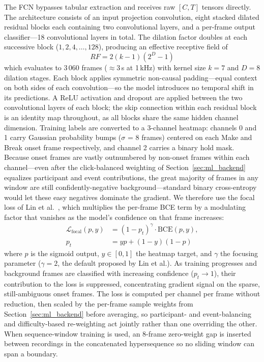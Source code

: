 The FCN bypasses tabular extraction and receives raw $[C, T]$ tensors directly. The architecture consists of an input projection convolution, eight stacked dilated residual blocks each containing two convolutional layers, and a per-frame output classifier---18 convolutional layers in total. The dilation factor doubles at each successive block ($1, 2, 4, \ldots, 128$), producing an effective receptive field of
\[
  RF = 2(k-1)(2^D - 1)
\]
which evaluates to 3\,060 frames ($\approx$3\,s at 1\,kHz) with kernel size $k = 7$ and $D = 8$ dilation stages. Each block applies symmetric non-causal padding---equal context on both sides of each convolution---so the model introduces no temporal shift in its predictions. A ReLU activation and dropout are applied between the two convolutional layers of each block; the skip connection within each residual block is an identity map throughout, as all blocks share the same hidden channel dimension. Training labels are converted to a 3-channel heatmap: channels 0 and 1 carry Gaussian probability bumps ($\sigma$ = 8 frames) centered on each Make and Break onset frame respectively, and channel 2 carries a binary hold mask. Because onset frames are vastly outnumbered by non-onset frames within each channel---even after the click-balanced weighting of Section~\ref{sec:ml_backend} equalizes participant and event contributions, the great majority of frames in any window are still confidently-negative background---standard binary cross-entropy would let these easy negatives dominate the gradient. We therefore use the focal loss of Lin et al.~\cite{lin_focal_2017}, which multiplies the per-frame BCE term by a modulating factor that vanishes as the model's confidence on that frame increases:
\begin{align*}
  \mathcal{L}_{\text{focal}}(p, y) &= (1 - p_t)^{\gamma} \cdot \text{BCE}(p, y), \\
  p_t &= y p + (1-y)(1-p)
\end{align*}
where $p$ is the sigmoid output, $y \in [0,1]$ the heatmap target, and $\gamma$ the focusing parameter ($\gamma = 2$, the default proposed by Lin et al.). As training progresses and background frames are classified with increasing confidence ($p_t \to 1$), their contribution to the loss is suppressed, concentrating gradient signal on the sparse, still-ambiguous onset frames. The loss is computed per channel per frame without reduction, then scaled by the per-frame sample weights from Section~\ref{sec:ml_backend} before averaging, so participant- and event-balancing and difficulty-based re-weighting act jointly rather than one overriding the other. When sequence-window training is used, an 8-frame zero-weight gap is inserted between recordings in the concatenated hypersequence so no sliding window can span a boundary.

